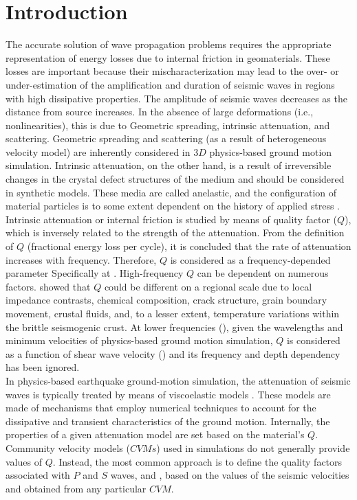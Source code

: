 
\section{Introduction}

The accurate solution of wave propagation problems requires the appropriate representation of energy losses due to internal friction in geomaterials. These losses are important because their mischaracterization may lead to the over- or under-estimation of the amplification and duration of seismic waves in regions with high dissipative properties. The amplitude of seismic waves decreases as the distance from source increases. In the absence of large deformations (i.e., nonlinearities), this is due to Geometric spreading, intrinsic attenuation, and scattering. Geometric spreading and scattering (as a result of heterogeneous velocity model) are inherently considered in $3D$ physics-based ground motion simulation. Intrinsic attenuation, on the other hand, is a result of irreversible changes in the crystal defect structures of the medium and should be considered in synthetic models. These media are called anelastic, and the configuration of material particles is to some extent dependent on the history of applied stress \citep{Aki_2002_Book}. Intrinsic attenuation or internal friction is studied by means of quality factor ($Q$), which is inversely related to the strength of the attenuation. From the definition of $Q$ (fractional energy loss per cycle), it is concluded that the rate of attenuation increases with frequency. Therefore, $Q$ is considered as a frequency-depended parameter \citep[e.g., see][ and references therein.]{Adams_1998_GJI, Mousavi_2014_JGR, Sedaghati_2015_BSSA, Nazemi_2017_TP} Specifically at  \citep[e.g., see ][]{Withers_2015_BSSA}. High-frequency $Q$ can be dependent on numerous factors. \citet{Hauksson_2006_JGR} showed that $Q$ could be different on a regional scale due to local impedance contrasts, chemical composition, crack structure, grain boundary movement, crustal fluids, and, to a lesser extent, temperature variations within the brittle seismogenic crust. At lower frequencies (), given the wavelengths and minimum velocities of physics-based ground motion simulation, $Q$ is considered as a function of shear wave velocity (\vs{}) and its frequency and depth dependency has been ignored.\\
In physics-based earthquake ground-motion simulation, the attenuation of seismic waves is typically treated by means of viscoelastic models \citep[e.g.,][]{Day_2001_BSSA, Graves_2003_BSSA, Kaser_2007_GJI, Bielak_2011_G}. These models are made of mechanisms that employ numerical techniques to account for the dissipative and transient characteristics of the ground motion. Internally, the properties of a given attenuation model are set based on the material's $Q$. Community velocity models ($CVMs$) used in simulations do not generally provide values of $Q$. Instead, the most common approach is to define the quality factors associated with $P$ and $S$ waves, \qp{} and \qs{}, based on the values of the seismic velocities \vp{} and \vs{} obtained from any particular $CVM$.\\

